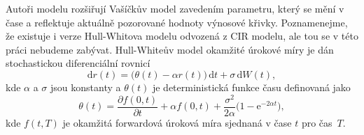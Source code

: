 \documentclass[a4paper,12pt]{report}
\theoremstyle{definition} \newtheorem{definice}[veta]{Definice}
\theoremstyle{remark}
\begin{document}

Autoři modelu rozšiřují Vašíčkův model zavedením parametru, který se mění v čase a reflektuje aktuálně pozorované hodnoty výnosové křivky.
Poznamenejme, že existuje i verze Hull-Whitova modelu odvozená z CIR modelu, ale tou se v této práci nebudeme zabývat.
Hull-Whiteův model okamžité úrokové míry je dán stochastickou diferenciální rovnicí
\begin{equation}\label{H-W_model}
 \mathrm{d}r(t)=\big(\theta(t)-\alpha r(t)\big)\,\mathrm{d}t+\sigma\,\mathrm{d}W(t),
\end{equation}
kde $\alpha$ a $\sigma$ jsou konstanty a $\theta(t)$ je deterministická funkce času definovaná jako
\begin{equation}
\theta(t)=\frac{\partial  f(0,t)}{\partial t}+\alpha f(0,t)+\frac{\sigma^2}{2 \alpha}\big(1-\mathrm{e}^{-2\alpha t}\big),
\end{equation}
kde $f(t,T)$ je okamžitá forwardová úroková míra sjednaná v čase $t$ pro čas~$T$.
\end{document}
